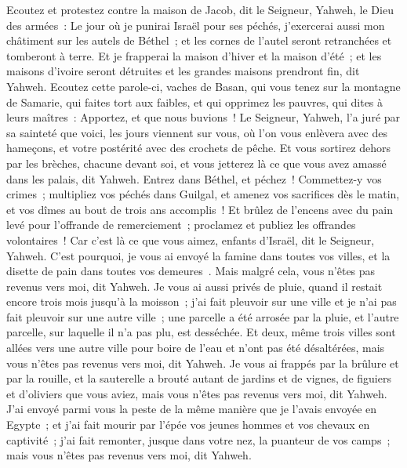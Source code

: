 \begin{multicols}{2}
Ecoutez et protestez contre la maison de Jacob, dit le Seigneur, Yahweh, le Dieu des armées~:
Le jour où je punirai Israël pour ses péchés, j'exercerai aussi mon châtiment sur les autels de Béthel~; et les cornes de l'autel seront retranchées et tomberont à terre.
Et je frapperai la maison d'hiver et la maison d'été~; et les maisons d'ivoire seront détruites et les grandes maisons prendront fin, dit Yahweh.
\VerseOne{}Ecoutez cette parole-ci, vaches de Basan, qui vous tenez sur la montagne de Samarie, qui faites tort aux faibles, et qui opprimez les pauvres, qui dites à leurs maîtres~: Apportez, et que nous buvions~!
Le Seigneur, Yahweh, l'a juré par sa sainteté que voici, les jours viennent sur vous, où l'on vous enlèvera avec des hameçons, et votre postérité avec des crochets de pêche.
Et vous sortirez dehors par les brèches, chacune devant soi, et vous jetterez là ce que vous avez amassé dans les palais, dit Yahweh.
Entrez dans Béthel, et péchez~! Commettez-y vos crimes~; multipliez vos péchés dans Guilgal, et amenez vos sacrifices dès le matin, et vos dîmes au bout de trois ans accomplis~!
Et brûlez de l'encens avec du pain levé pour l'offrande de remerciement~; proclamez et publiez les offrandes volontaires~! Car c'est là ce que vous aimez, enfants d'Israël, dit le Seigneur, Yahweh.
C'est pourquoi, je vous ai envoyé la famine dans toutes vos villes, et la disette de pain dans toutes vos demeures~. Mais malgré cela, vous n'êtes pas revenus vers moi, dit Yahweh.
Je vous ai aussi privés de pluie, quand il restait encore trois mois jusqu'à la moisson~; j'ai fait pleuvoir sur une ville et je n'ai pas fait pleuvoir sur une autre ville~; une parcelle a été arrosée par la pluie, et l'autre parcelle, sur laquelle il n'a pas plu, est desséchée.
Et deux, même trois villes sont allées vers une autre ville pour boire de l'eau et n'ont pas été désaltérées, mais vous n'êtes pas revenus vers moi, dit Yahweh.
Je vous ai frappés par la brûlure et par la rouille, et la sauterelle a brouté autant de jardins et de vignes, de figuiers et d'oliviers que vous aviez, mais vous n'êtes pas revenus vers moi, dit Yahweh.
J'ai envoyé parmi vous la peste de la même manière que je l'avais envoyée en Egypte~; et j'ai fait mourir par l'épée vos jeunes hommes et vos chevaux en captivité~; j'ai fait remonter, jusque dans votre nez, la puanteur de vos camps~; mais vous n'êtes pas revenus vers moi, dit Yahweh.

\end{multicols}
